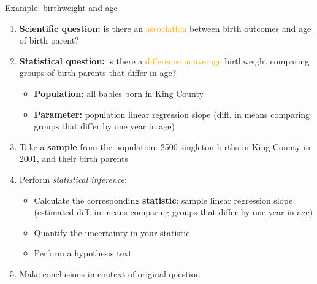 \documentclass[10pt,t]{beamer}
\begin{document}
\begin{frame}{Example: birthweight and age}
\begin{enumerate}
	\item \textbf{Scientific question:} is there an \textcolor{orange}{association} between birth outcomes and age of birth parent?
	\item \textbf{Statistical question:} is there a \textcolor{orange}{difference in average} birthweight comparing groups of birth parents that differ in age?
	\begin{itemize}
		\item \textbf{Population:} all babies born in King County
		\item \textbf{Parameter:} population linear regression slope (diff. in means comparing groups that differ by one year in age)
	\end{itemize}
	\item Take a \textbf{sample} from the population: 2500 singleton births in King County in 2001, and their birth parents
	\item Perform \textit{statistical inference}:
	\begin{itemize}
		\item Calculate the corresponding \textbf{statistic}: sample linear regression slope (estimated diff. in means comparing groups that differ by one year in age)
		\item Quantify the uncertainty in your statistic
		\item Perform a hypothesis text
	\end{itemize}
	\item Make conclusions in context of original question
\end{enumerate}
\end{frame}
\end{document}
